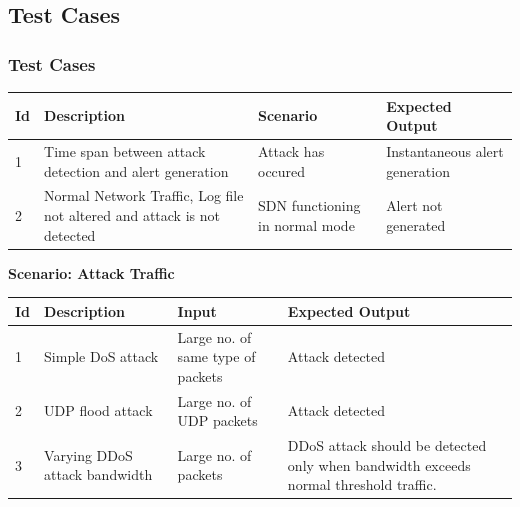 \documentclass[10pt]{beamer}
\begin{document}
\begin{frame}
\section[]{Test Cases}
\frametitle{Test Cases}
\footnotesize
\begin{center}
\begin{tabular}{|p{0.5cm}|p{3.8cm}|p{2.2cm}|p{2.5cm}|}
\hline 
 \textbf{Id} & \textbf{Description} & \textbf{Scenario} & \textbf{Expected Output} \\ 
\hline 
 1 & Time span between attack detection and alert generation & Attack has occured & Instantaneous alert generation\\
 \hline
 2 & Normal Network Traffic, Log file not altered and attack is not detected & SDN functioning in normal mode & Alert not generated\\ 
\hline 
\end{tabular} 
\end{center}

\textbf{Scenario: Attack Traffic}
\begin{center}
\begin{tabular}{|p{0.5cm}|p{3.8cm}|p{2.2cm}|p{2.5cm}|}
\hline 
 \textbf{Id} & \textbf{Description} & \textbf{Input} & \textbf{Expected Output} \\ 
\hline 
 1 & Simple DoS attack & Large no. of same type of packets & Attack detected\\
 \hline
 2 & UDP flood attack & Large no. of UDP packets & Attack detected\\ 
 \hline
 3 & Varying DDoS attack bandwidth & Large no. of packets & DDoS attack should be detected only when bandwidth exceeds normal threshold traffic. \\
\hline 
\end{tabular} 
\end{center}
\end{frame}
\end{document}
